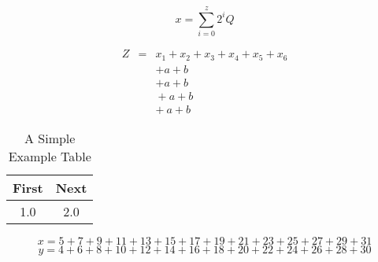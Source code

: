 \documentclass[9pt,technote]{IEEEtran}
\begin{document}


\begin{equation}
\label{eqn_example}
x = \sum\limits_{i=0}^{z} 2^{i}Q
\end{equation}



\setlength{\arraycolsep}{0.0em}
\begin{eqnarray}
Z&{}={}&x_1 + x_2 + x_3 + x_4 + x_5 + x_6\nonumber\\
&&+a + b\\
&&+{}a + b\\
&&{}+a + b\\
&&{+}\:a + b
\end{eqnarray}
\setlength{\arraycolsep}{5pt}



\begin{table}[!t]
\renewcommand{\arraystretch}{1.3}
\caption{A Simple Example Table}
\label{table_example}
\centering
\begin{tabular}{c||c}
\hline
\bfseries First & \bfseries Next\\
\hline\hline
1.0 & 2.0\\
\hline
\end{tabular}
\end{table}



\begin{figure*}[!t]
\normalsize
\setcounter{MYtempeqncnt}{\value{equation}}
\setcounter{equation}{5}
\begin{equation}
\label{eqn_dbl_x}
x = 5 + 7 + 9 + 11 + 13 + 15 + 17 + 19 + 21+ 23 + 25
+ 27 + 29 + 31
\end{equation}
\begin{equation}
\label{eqn_dbl_y}
y = 4 + 6 + 8 + 10 + 12 + 14 + 16 + 18 + 20+ 22 + 24
+ 26 + 28 + 30
\end{equation}
\setcounter{equation}{\value{MYtempeqncnt}}
\hrulefill
\vspace*{4pt}
\end{figure*}
\end{document}

